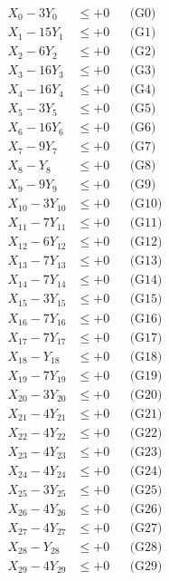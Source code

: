 \documentclass[a4paper,10pt]{article}
\begin{document}
\allowdisplaybreaks
{\small
\begin{align}
X_{0} - 3Y_{0} &\leq +0 && \text{(G0)} \\
X_{1} - 15Y_{1} &\leq +0 && \text{(G1)} \\
X_{2} - 6Y_{2} &\leq +0 && \text{(G2)} \\
X_{3} - 16Y_{3} &\leq +0 && \text{(G3)} \\
X_{4} - 16Y_{4} &\leq +0 && \text{(G4)} \\
X_{5} - 3Y_{5} &\leq +0 && \text{(G5)} \\
X_{6} - 16Y_{6} &\leq +0 && \text{(G6)} \\
X_{7} - 9Y_{7} &\leq +0 && \text{(G7)} \\
X_{8} - Y_{8} &\leq +0 && \text{(G8)} \\
X_{9} - 9Y_{9} &\leq +0 && \text{(G9)} \\
\allowbreak
X_{10} - 3Y_{10} &\leq +0 && \text{(G10)} \\
X_{11} - 7Y_{11} &\leq +0 && \text{(G11)} \\
X_{12} - 6Y_{12} &\leq +0 && \text{(G12)} \\
X_{13} - 7Y_{13} &\leq +0 && \text{(G13)} \\
X_{14} - 7Y_{14} &\leq +0 && \text{(G14)} \\
X_{15} - 3Y_{15} &\leq +0 && \text{(G15)} \\
X_{16} - 7Y_{16} &\leq +0 && \text{(G16)} \\
X_{17} - 7Y_{17} &\leq +0 && \text{(G17)} \\
X_{18} - Y_{18} &\leq +0 && \text{(G18)} \\
X_{19} - 7Y_{19} &\leq +0 && \text{(G19)} \\
\allowbreak
X_{20} - 3Y_{20} &\leq +0 && \text{(G20)} \\
X_{21} - 4Y_{21} &\leq +0 && \text{(G21)} \\
X_{22} - 4Y_{22} &\leq +0 && \text{(G22)} \\
X_{23} - 4Y_{23} &\leq +0 && \text{(G23)} \\
X_{24} - 4Y_{24} &\leq +0 && \text{(G24)} \\
X_{25} - 3Y_{25} &\leq +0 && \text{(G25)} \\
X_{26} - 4Y_{26} &\leq +0 && \text{(G26)} \\
X_{27} - 4Y_{27} &\leq +0 && \text{(G27)} \\
X_{28} - Y_{28} &\leq +0 && \text{(G28)} \\
X_{29} - 4Y_{29} &\leq +0 && \text{(G29)} \\

\end{align}}
\end{document}
